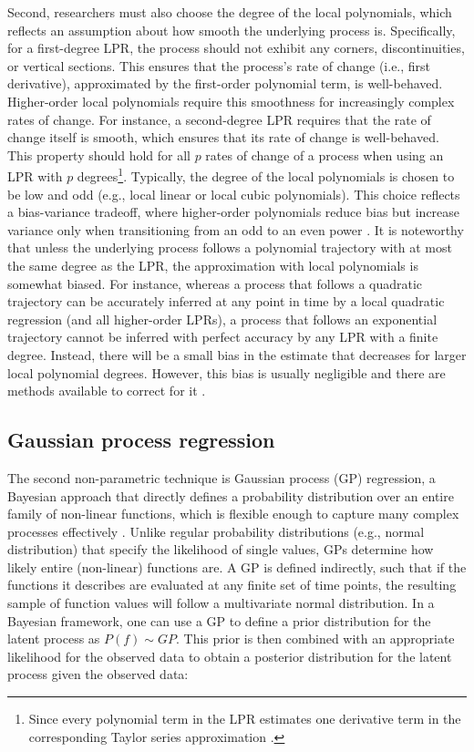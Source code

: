 \documentclass[man, floatsintext]{apa7}
\begin{document}
Second, researchers must also choose the degree of the local polynomials, which
reflects an assumption about how smooth the underlying process is.
Specifically, for a first-degree LPR, the process should not exhibit any
corners, discontinuities, or vertical sections. This ensures that the process's
rate of change (i.e., first derivative), approximated by the first-order
polynomial term, is well-behaved. Higher-order local polynomials require this
smoothness for increasingly complex rates of change. For instance, a
second-degree LPR requires that the rate of change itself is smooth, which
ensures that its rate of change is well-behaved. This property should hold for
all $p$ rates of change of a process when using an LPR with $p$
degrees\footnote{Since every polynomial term in the LPR estimates one
  derivative term in the corresponding Taylor series approximation
  \parencite{avery_literature_nodate}.}. Typically, the degree of the local
polynomials is chosen to be low and odd (e.g., local linear or local cubic
polynomials). This choice reflects a bias-variance tradeoff, where higher-order
polynomials reduce bias but increase variance only when transitioning from an
odd to an even power \parencite{ruppert_multivariate_1994}. It is noteworthy
that unless the underlying process follows a polynomial trajectory with at most
the same degree as the LPR, the approximation with local polynomials is
somewhat biased. For instance, whereas a process that follows a quadratic
trajectory can be accurately inferred at any point in time by a local quadratic
regression (and all higher-order LPRs), a process that follows an exponential
trajectory cannot be inferred with perfect accuracy by any LPR with a finite
degree. Instead, there will be a small bias in the estimate that decreases for
larger local polynomial degrees. However, this bias is usually negligible and
there are methods available to correct for it \parencite{R-nprobust}.

\subsection{Gaussian process regression}

The second non-parametric technique is Gaussian process (GP) regression, a
Bayesian approach that directly defines a probability distribution over an
entire family of non-linear functions, which is flexible enough to capture many
complex processes effectively \parencite{rasmussen_gaussian_2006,
  betancourt_robust_2020, roberts_gaussian_2013}. Unlike regular probability
distributions (e.g., normal distribution) that specify the likelihood of
single values, GPs determine how likely entire
(non-linear) functions are. A GP is defined indirectly, such that if the
functions it describes are evaluated at any finite set of time points, the
resulting sample of function values will follow a multivariate normal
distribution. In a Bayesian framework, one can use a GP to define a prior
distribution for the latent process as $P(f) \sim GP$. This prior is then
combined with an appropriate likelihood for the observed data to obtain a
posterior distribution for the latent process given the observed data:
\end{document}

